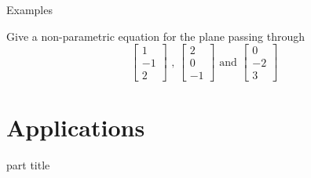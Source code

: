 \documentclass{beamer}
\begin{document}
\begin{frame}{Examples}
\begin{example}
  Give a non-parametric equation for the plane passing through
  \begin{equation*}
  \left[
  \begin{array}{c}
  1\\
  -1\\
  2
  \end{array}
  \right]\text{ , } \left[
  \begin{array}{c}
  2\\
  0\\
  -1
  \end{array}
  \right]\text{ and }
  \left[
  \begin{array}{c}
  0\\
  -2\\
  3
  \end{array}
  \right]
  \end{equation*}
\end{example}
\end{frame}

\section{Applications}

\begin{frame}
\begin{beamercolorbox}[sep=12pt,center]{part title}
\insertsection\par
\end{beamercolorbox}
\end{frame}
\end{document}
